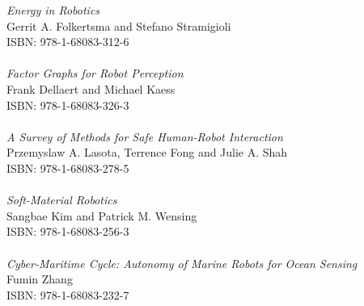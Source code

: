 \vspace{12pt}
\noindent \textit{Energy in Robotics}\\
Gerrit A. Folkertsma and Stefano Stramigioli\\
ISBN: 978-1-68083-312-6\\
\\
\noindent \textit{Factor Graphs for Robot Perception}\\
Frank Dellaert and Michael Kaess\\
ISBN: 978-1-68083-326-3\\
\\
\noindent \textit{A Survey of Methods for Safe Human-Robot Interaction}\\
Przemyslaw A. Lasota, Terrence Fong and Julie A. Shah\\
ISBN: 978-1-68083-278-5\\
\\
\noindent \textit{Soft-Material Robotics}\\
Sangbae Kim and Patrick M. Wensing \\
ISBN: 978-1-68083-256-3\\
\\
\noindent \textit{Cyber-Maritime Cycle: Autonomy of Marine Robots for Ocean Sensing}\\
Fumin Zhang\\
ISBN: 978-1-68083-232-7